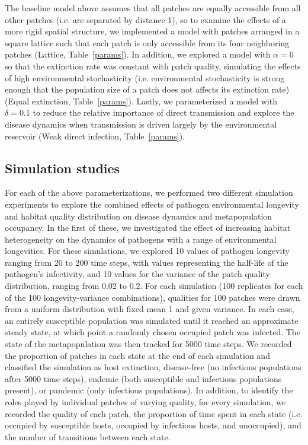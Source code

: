 \documentclass{svjour3}
\begin{document}
The baseline model above assumes that all patches are equally accessible from all other patches (i.e. are separated by distance 1), so to examine the effects of a more rigid spatial structure, we implemented a model with patches arranged in a square lattice such that each patch is only accessible from its four neighboring patches (Lattice, Table~\ref{params}).  In addition, we explored a model with $\alpha = 0$ so that the extinction rate was constant with patch quality, simulating the effects of high environmental stochasticity (i.e. environmental stochasticity is strong enough that the population size of a patch does not affects its extinction rate)(Equal extinction, Table~\ref{params}).  Lastly, we parameterized a model with $\delta = 0.1$ to reduce the relative importance of direct transmission and explore the disease dynamics when transmission is driven largely by the environmental reservoir (Weak direct infection, Table~\ref{params}). 

\subsection{Simulation studies}

For each of the above parameterizations, we performed two different simulation experiments to explore the combined effects of pathogen environmental longevity and habitat quality distribution on disease dynamics and metapopulation occupancy.  In the first of these, we investigated the effect of increasing habitat heterogeneity on the dynamics of pathogens with a range of environmental longevities.  For these simulations, we explored 10 values of pathogen longevity ranging from 20 to 200 time steps, with values representing the half-life of the pathogen's infectivity, and 10 values for the variance of the patch quality distribution, ranging from 0.02 to 0.2.  For each simulation (100 replicates for each of the 100 longevity-variance combinations), qualities for 100 patches were drawn from a uniform distribution with fixed mean 1 and given variance. In each case, an entirely susceptible population was simulated until it reached an approximate steady state, at which point a randomly chosen occupied patch was infected.  The state of the metapopulation was then tracked for 5000 time steps.  We recorded the proportion of patches in each state at the end of each simulation and classified the simulation as host extinction, disease-free (no infectious populations after 5000 time steps), endemic (both susceptible and infectious populations present), or pandemic (only infectious populations).  In addition, to identify the roles played by individual patches of varying quality, for every simulation, we recorded the quality of each patch, the proportion of time spent in each state (i.e. occupied by susceptible hosts, occupied by infectious hosts, and unoccupied), and the number of transitions between each state.  
\end{document}

